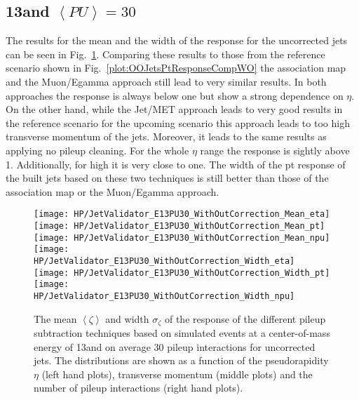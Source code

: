 \subsection{13\TeV and $\left<PU\right> =30$ \label{sec:HPUJetE13PU30}}

The results for the mean and the width of the \pt{} response for the uncorrected jets can be seen in Fig.~\ref{plot:HPUJetE13PU30WO}. Comparing these results to those from the reference scenario shown in Fig.~\ref{plot:OOJetsPtResponseCompWO} the association map and the Muon/Egamma approach still lead to very similar results. In both approaches the \pt{} response is always below one but show a strong dependence on $\eta$. On the other hand, while the Jet/MET approach leads to very good results in the reference scenario for the upcoming scenario this approach leads to too high transverse momentum of the jets. Moreover, it leads to the same results as applying no pileup cleaning. For the whole $\eta$ range the \pt{} response is sightly above 1. Additionally, for high \pt{} it is very close to one. The width of the pt response of the built jets based on these two techniques is still better than those of the association map or the Muon/Egamma approach. 

\begin{figure}[Ht]
  \centering
  \texttt{[image: HP/JetValidator\_E13PU30\_WithOutCorrection\_Mean\_eta]}
  \texttt{[image: HP/JetValidator\_E13PU30\_WithOutCorrection\_Mean\_pt]}
  \texttt{[image: HP/JetValidator\_E13PU30\_WithOutCorrection\_Mean\_npu]}
  \\
  \texttt{[image: HP/JetValidator\_E13PU30\_WithOutCorrection\_Width\_eta]}
  \texttt{[image: HP/JetValidator\_E13PU30\_WithOutCorrection\_Width\_pt]}
  \texttt{[image: HP/JetValidator\_E13PU30\_WithOutCorrection\_Width\_npu]}
  \caption[Mean and width of the \pt{} response of different pileup subtraction techniques based on simulated \ttbar events with 13\TeV and $\left<PU\right>=30$ for uncorrected jets]{The mean $\left<\zeta\right>$ and width $\sigma_{\zeta}$ of the \pt{} response of the different pileup subtraction techniques based on simulated \ttbar events at a center-of-mass energy of 13\TeV and on average 30 pileup interactions for uncorrected jets. The distributions are shown as a function of the pseudorapidity $\eta$ (left hand plots), transverse momentum (middle plots) and the number of pileup interactions (right hand plots). \label{plot:HPUJetE13PU30WO}}
\end{figure}

